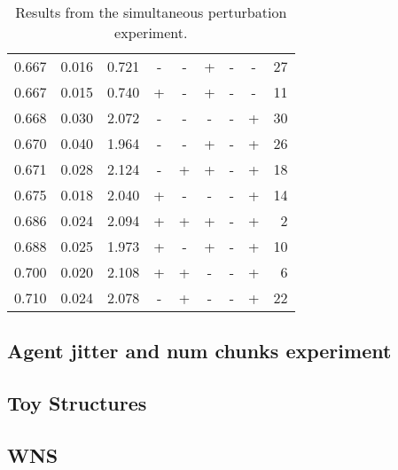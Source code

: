 \documentclass[11pt]{article}
\begin{document}
\begin{table}[ht]
\begin{tabular}{rrrcccccr}
  0.667 & 0.016 & 0.721 & - & - & + & - & - & 27 \\ 
  0.667 & 0.015 & 0.740 & + & - & + & - & - & 11 \\ 
  0.668 & 0.030 & 2.072 & - & - & - & - & + & 30 \\ 
  0.670 & 0.040 & 1.964 & - & - & + & - & + & 26 \\ 
  0.671 & 0.028 & 2.124 & - & + & + & - & + & 18 \\ 
  0.675 & 0.018 & 2.040 & + & - & - & - & + & 14 \\ 
  0.686 & 0.024 & 2.094 & + & + & + & - & + & 2 \\ 
  0.688 & 0.025 & 1.973 & + & - & + & - & + & 10 \\ 
  0.700 & 0.020 & 2.108 & + & + & - & - & + & 6 \\ 
  0.710 & 0.024 & 2.078 & - & + & - & - & + & 22 \\ 
   \hline
\end{tabular}
\caption{Results from the simultaneous perturbation experiment.} 
\end{table}




\subsection{Agent jitter and num chunks experiment}
\label{sec-5-2}

\subsection{Toy Structures}
\label{sec-5-3}

\subsection{WNS}
\label{sec-5-4}
\end{document}
